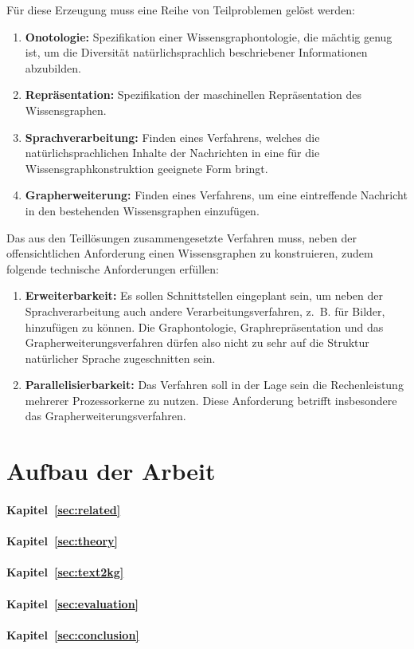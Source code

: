 Für diese Erzeugung muss eine Reihe von Teilproblemen gelöst werden:
\begin{enumerate}
	\item \textbf{Onotologie:}
		Spezifikation einer Wissensgraphontologie, die mächtig genug ist, um die Diversität natürlichsprachlich beschriebener Informationen abzubilden.
	\item \textbf{Repräsentation:}
		Spezifikation der maschinellen Repräsentation des Wissensgraphen.
	\item \textbf{Sprachverarbeitung:}
		Finden eines Verfahrens, welches die natürlichsprachlichen Inhalte der Nachrichten in eine für die Wissensgraphkonstruktion geeignete Form bringt.
	\item \textbf{Grapherweiterung:}
		Finden eines Verfahrens, um eine eintreffende Nachricht in den bestehenden Wissensgraphen einzufügen.
\end{enumerate}

Das aus den Teillösungen zusammengesetzte Verfahren muss, neben der offensichtlichen Anforderung einen Wissensgraphen zu konstruieren, zudem folgende technische Anforderungen erfüllen:
\begin{enumerate}
	\item \textbf{Erweiterbarkeit:}
		Es sollen Schnittstellen eingeplant sein, um neben der Sprachverarbeitung auch andere Verarbeitungsverfahren, z.~B. für Bilder, hinzufügen zu können.
		Die Graphontologie, Graphrepräsentation und das Grapherweiterungsverfahren dürfen also nicht zu sehr auf die Struktur natürlicher Sprache zugeschnitten sein.
	\item \textbf{Parallelisierbarkeit:}
		Das Verfahren soll in der Lage sein die Rechenleistung mehrerer Prozessorkerne zu nutzen.
		Diese Anforderung betrifft insbesondere das Grapherweiterungsverfahren.
\end{enumerate}

\section{Aufbau der Arbeit}%
\label{sec:intro:structure}

\paragraph{Kapitel~\ref{sec:related}}

\paragraph{Kapitel~\ref{sec:theory}}

\paragraph{Kapitel~\ref{sec:text2kg}}

\paragraph{Kapitel~\ref{sec:evaluation}}

\paragraph{Kapitel~\ref{sec:conclusion}}
